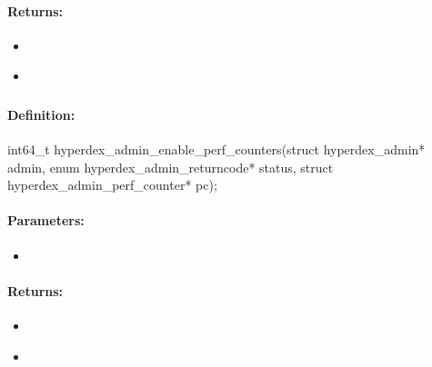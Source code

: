 \paragraph{Returns:}
\begin{itemize}[noitemsep]
\item {}\\

\item {}\\

\end{itemize}

\pagebreak
\subsubsection{}
\label{api:c:enable_perf_counters}


\paragraph{Definition:}
\begin{ccode}
int64_t hyperdex_admin_enable_perf_counters(struct hyperdex_admin* admin,
        enum hyperdex_admin_returncode* status,
        struct hyperdex_admin_perf_counter* pc);
\end{ccode}

\paragraph{Parameters:}
\begin{itemize}[noitemsep]
\item {}\\

\end{itemize}

\paragraph{Returns:}
\begin{itemize}[noitemsep]
\item {}\\

\item {}\\

\end{itemize}


